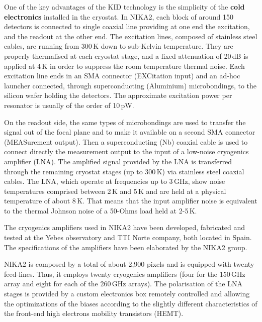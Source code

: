 \documentclass[]{aa} %
\begin{document}
One of the key advantages of the KID technology is the simplicity of the {\bf{cold electronics}} installed in the cryostat.
In NIKA2, each block of around 150 detectors is connected to single coaxial line providing at one end the excitation, and the readout at the other end. The excitation lines, composed of stainless steel cables, are running from 300\,K down to sub-Kelvin temperature. They are properly thermalised at each cryostat stage, and a fixed attenuation of 20\,dB is applied at 4\,K in order to suppress the room temperature thermal noise. Each excitation line ends in an SMA connector (EXCitation input) and an ad-hoc launcher connected, through superconducting (Aluminium) microbondings, to the silicon wafer holding the detectors. The approximate excitation power per resonator is usually of the order of 10\,pW.

On the readout side, the same types of microbondings are used to transfer the signal out of the focal plane and to make it available on a second SMA connector (MEASurement output). Then a superconducting (Nb) coaxial cable is used to connect directly the measurement output to the input of a low-noise cryogenics amplifier (LNA). The amplified signal provided by the LNA is transferred through the remaining cryostat stages (up to 300\,K) via stainless steel coaxial cables. The LNA, which operate at frequencies up to 3\,GHz, show noise temperatures comprised between 2\,K and 5\,K and are held at a physical temperature of about 8\,K. That means that the input amplifier noise is equivalent to the thermal Johnson noise of a 50-Ohms load held at 2-5\,K.

The cryogenics amplifiers used in NIKA2 have been developed, fabricated and tested at the Yebes observatory and TTI Norte company, both located in Spain. The specifications of the amplifiers have been elaborated by the NIKA2 group.

NIKA2 is composed by a total of about 2,900 pixels and is equipped with twenty feed-lines. Thus, it employs twenty cryogenics amplifiers (four for the 150\,GHz array and eight for each of the 260\,GHz arrays). The polarisation of the LNA stages is provided by a custom electronics box remotely controlled and allowing the optimizations of the biases according to the slightly different characteristics of the front-end high electrons mobility transistors (HEMT). 
\end{document}
